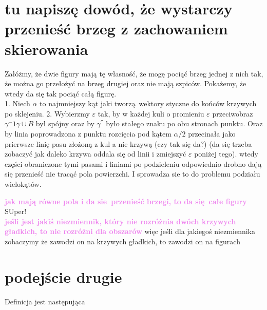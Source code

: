 \documentclass[a4paper, 12pt]{article}
\newcommand{\content}[1]{\hfill \break \textbf{\large \textcolor{violet}{#1} \hfill \break}\normalsize}
\begin{document}
\section{tu napiszę dowód, że wystarczy przenieść brzeg z zachowaniem skierowania}

Załóżmy, że dwie figury mają tę własność, że mogę pociąć brzeg jednej z nich tak, że można go przełożyć na
brzeg drugiej oraz nie mają szpiców. Pokażemy, że wtedy da się tak pociąć całą figurę. \\
1. Niech $\alpha$ to najmniejszy kąt jaki tworzą wektory styczne do końców krzywych po sklejeniu.
2. Wybierzmy $\varepsilon$ tak, by w każdej kuli o promieniu $\varepsilon$ przeciwobraz $\gamma^-{1}\gamma
\cup B$ był spójny oraz by $\gamma^{''}$ było stałego znaku po obu stronach punktu. Oraz by linia
poprowadzona z punktu rozcięcia pod kątem $\alpha/2$ przecinała jako prierwsze linię pasu złożoną z kul a
nie krzywą (czy tak się da?) (da się trzeba zobaczyć jak daleko krzywa oddala się od linii i zmiejszyć
$\varepsilon$ poniżej tego). wtedy części obraniczone tymi pasami i liniami po podzieleniu odpowiednio
drobno dają się przenieść nie tracąć pola powierzchi. I sprowadza sie to do problemu podziału wielokątów.

\content{jak mają równe pola i da sie przenieść brzegi, to da się całe figury}
SUper! \\
\content{jeśli jest jakiś niezmiennik, który nie rozróżnia dwóch krzywych gładkich, to nie rozróżni dla
obszarów}
więc jeśli dla jakiegoś niezmiennika zobaczymy że zawodzi on na krzywych gładkich, to zawodzi on na
figurach \\

\section{podejście drugie}


Definicja jest następująca
\end{document}
